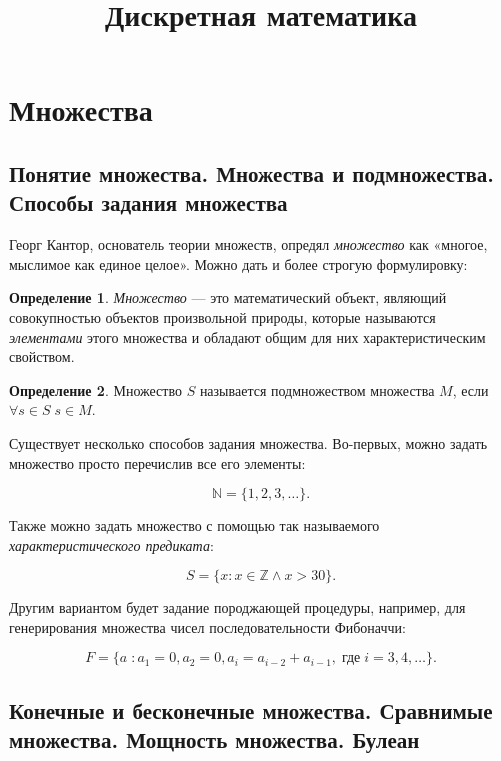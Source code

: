 \documentclass{article}
\theoremstyle{plain}
\theoremstyle{definition}
\newtheorem{definition}{Определение}[subsection]
\begin{document}
\sloppy

\title{Дискретная математика}
\date{\vspace{-5ex}}
\maketitle

\section{Множества}

\subsection{Понятие множества. Множества и подмножества. Способы задания множества}

Георг Кантор, основатель теории множеств, опредял \textit{множество} как «многое, мыслимое как единое целое». Можно дать и более строгую формулировку:

\begin{definition}
	\textit{Множество} — это математический объект, являющий совокупностью объектов произвольной природы, которые называются \textit{элементами} этого множества и обладают общим для них характеристическим свойством.
\end{definition}

\begin{definition}
	Множество \(S\) называется подмножеством множества \(M\), если \(\forall s \in S\; s \in M\).
\end{definition}

Существует несколько способов задания множества. Во-первых, можно задать множество просто перечислив все его элементы:

\[
	\mathbb{N} = \{1, 2, 3, \ldots\}.
\]

Также можно задать множество с помощью так называемого \textit{характеристического предиката}:

\[
	S = \{x \colon x \in \mathbb{Z} \land x > 30\}.
\]

Другим вариантом будет задание породжающей процедуры, например, для генерирования множества чисел последовательности Фибоначчи:

\[
	F = \{a \;\colon a_1 = 0, a_2 = 0, a_i = a_{i - 2} + a_{i - 1}, \;\text{где}\; i = 3, 4, \ldots\}.
\]

\subsection{Конечные и бесконечные множества. Сравнимые множества. Мощность множества. Булеан}
\end{document}
